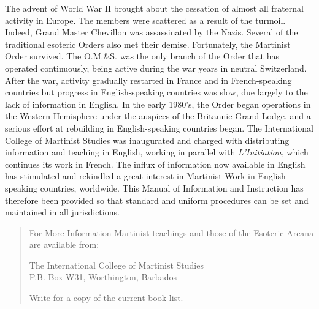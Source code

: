 The advent of World War II brought about the cessation of almost all fraternal
activity in Europe. The members were scattered as a result of the turmoil. Indeed, Grand
Master Chevillon was assassinated by the Nazis. Several of the traditional esoteric Orders
also met their demise. Fortunately, the Martinist Order survived. The O.M.\&S. was the
only branch of the Order that has operated continuously, being active during the war years
in neutral Switzerland. After the war, activity gradually restarted in France and in French-speaking countries but progress in English-speaking countries was slow, due largely to the
lack of information in English. In the early 1980’s, the Order began operations in the
Western Hemisphere under the auspices of the Britannic Grand Lodge, and a serious effort
at rebuilding in English-speaking countries began. The International College of Martinist
Studies was inaugurated and charged with distributing information and teaching in English,
working in parallel with \textit{L’Initiation}, which continues its work in French. The influx of
information now available in English has stimulated and rekindled a great interest in Martinist Work in
English-speaking countries, worldwide. This Manual of Information and Instruction has therefore been
provided so that standard and uniform procedures can be set and maintained in all jurisdictions. 

\begin{quote}{For More Information}
    Martinist teachings and those of the Esoteric Arcana are available from:
    
    The International College of Martinist Studies\\
    P.B. Box W31, Worthington, Barbados
    
    Write for a copy of the current book list.
\end{quote}